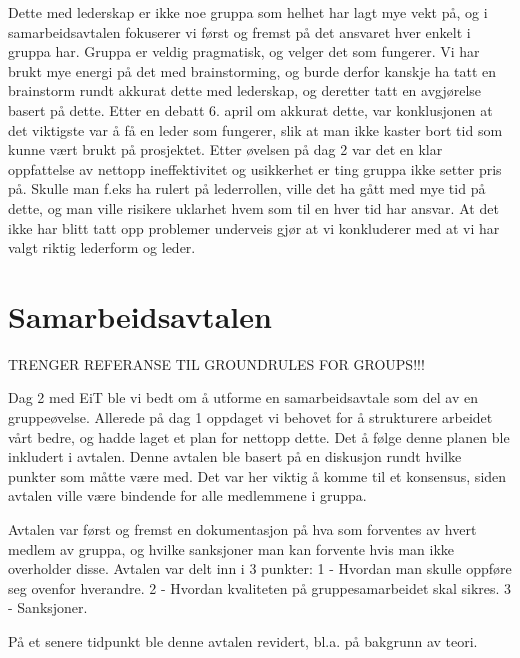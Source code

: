Dette med lederskap er ikke noe gruppa som helhet har lagt mye vekt på, og i
samarbeidsavtalen fokuserer vi først og fremst på det ansvaret hver enkelt i
gruppa har.  Gruppa er veldig pragmatisk, og velger det som fungerer. Vi har
brukt mye energi på det med brainstorming, og burde derfor kanskje ha tatt en
brainstorm rundt akkurat dette med lederskap, og deretter tatt en avgjørelse
basert på dette.  Etter en debatt 6. april om akkurat dette, var konklusjonen
at det viktigste var å få en leder som fungerer, slik at man ikke kaster bort
tid som kunne vært brukt på prosjektet. Etter øvelsen på dag 2 var det en klar
oppfattelse av nettopp ineffektivitet og usikkerhet er ting gruppa ikke setter
pris på. Skulle man f.eks ha rulert på lederrollen, ville det ha gått med mye
tid på dette, og man ville risikere uklarhet hvem som til en hver tid har
ansvar. At det ikke har blitt tatt opp problemer underveis gjør at vi
konkluderer med at vi har valgt riktig lederform og leder. 


\chapter{Samarbeidsavtalen}

TRENGER REFERANSE TIL GROUNDRULES FOR GROUPS!!!

Dag 2 med EiT ble vi bedt om å utforme en samarbeidsavtale som del av en 
gruppeøvelse. Allerede på dag 1 oppdaget vi behovet for å strukturere arbeidet
vårt bedre, og hadde laget et plan for nettopp dette. Det å følge denne planen
ble inkludert i avtalen. Denne avtalen ble basert på en diskusjon rundt hvilke
punkter som måtte være med. Det var her viktig å komme til et konsensus, siden
avtalen ville være bindende for alle medlemmene i gruppa.

Avtalen var først og fremst en dokumentasjon på hva som forventes av hvert
medlem av gruppa, og hvilke sanksjoner man kan forvente hvis man ikke
overholder disse. Avtalen var delt inn i 3 punkter: 
	1 - Hvordan man skulle oppføre seg ovenfor hverandre.
	2 - Hvordan kvaliteten på gruppesamarbeidet skal sikres.
	3 - Sanksjoner.

På et senere tidpunkt ble denne avtalen revidert, bl.a. på bakgrunn av teori.
